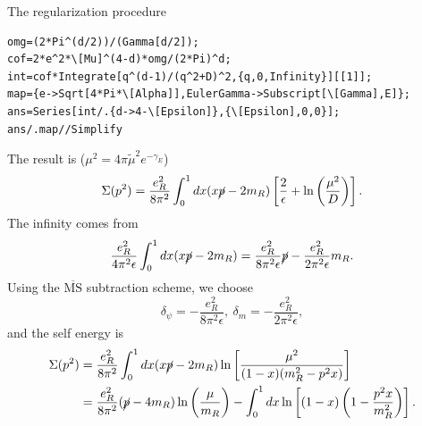 The regularization procedure
\begin{lstlisting}[style=mathematicaFrameTB]
omg=(2*Pi^(d/2))/(Gamma[d/2]);
cof=2*e^2*\[Mu]^(4-d)*omg/(2*Pi)^d;
int=cof*Integrate[q^(d-1)/(q^2+D)^2,{q,0,Infinity}][[1]];
map={e->Sqrt[4*Pi*\[Alpha]],EulerGamma->Subscript[\[Gamma],E]};
ans=Series[int/.{d->4-\[Epsilon]},{\[Epsilon],0,0}];
ans/.map//Simplify
\end{lstlisting}
The result is ($\mu^2 = 4\pi \tilde\mu^2 e^{-\gamma_E}$)
\begin{equation}
	\Sigma(p^2) = \frac{e_R^2}{8\pi^2}\int_0^1 dx(x\cancel{p}-2m_R)\left[\frac{2}{\epsilon}+\ln\left(\frac{\mu^2}{D}\right)\right].
\end{equation}
The infinity comes from
\begin{equation*}
	\frac{e_R^2}{4\pi^2\epsilon}\int_0^1 dx(x\cancel{p}-2m_R)
	= \frac{e_R^2}{8\pi^2\epsilon}\cancel{p} - \frac{e_R^2}{2\pi^2\epsilon}m_R.
\end{equation*}
Using the $\overline{\mathrm{MS}}$ subtraction scheme, we choose
\begin{equation}
	\delta_{\psi} = -\frac{e_R^2}{8\pi^2\epsilon},\ 
	\delta_m = -\frac{e_R^2}{2\pi^2\epsilon},
\end{equation}
and the self energy is
\begin{equation}
\begin{aligned}
	\Sigma(p^2) 
	&= \frac{e_R^2}{8\pi^2}\int_0^1 dx(x\cancel{p}-2m_R)\ln\left[\frac{\mu^2}{(1-x)(m_R^2-p^2 x)}\right] \\
	&= \frac{e_R^2}{8\pi^2}(\cancel{p}-4m_R)\ln\left(\frac{\mu}{m_R}\right)-\int_0^1 dx \ln\left[(1-x)\left(1-\frac{p^2x}{m_R^2}\right)\right].
\end{aligned}
\end{equation}



